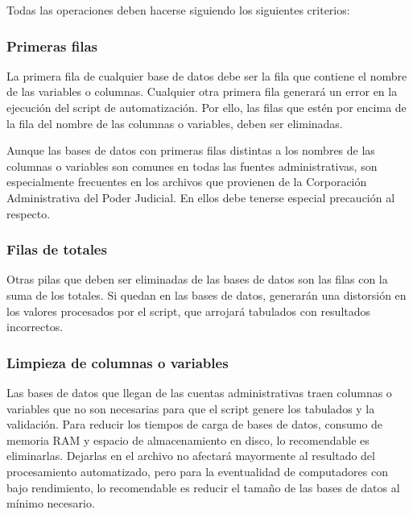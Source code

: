 \documentclass[
  spanish,
]{book}
\begin{document}
Todas las operaciones deben hacerse siguiendo los siguientes criterios:

\hypertarget{primeras-filas}{%
\subsubsection{Primeras filas}\label{primeras-filas}}

La primera fila de cualquier base de datos debe ser la fila que contiene el nombre de las variables o columnas. Cualquier otra primera fila generará un error en la ejecución del script de automatización. Por ello, las filas que estén por encima de la fila del nombre de las columnas o variables, deben ser eliminadas.

Aunque las bases de datos con primeras filas distintas a los nombres de las columnas o variables son comunes en todas las fuentes administrativas, son especialmente frecuentes en los archivos que provienen de la Corporación Administrativa del Poder Judicial. En ellos debe tenerse especial precaución al respecto.

\hypertarget{filas-de-totales}{%
\subsubsection{Filas de totales}\label{filas-de-totales}}

Otras pilas que deben ser eliminadas de las bases de datos son las filas con la suma de los totales. Si quedan en las bases de datos, generarán una distorsión en los valores procesados por el script, que arrojará tabulados con resultados incorrectos.

\hypertarget{limpieza-de-columnas-o-variables}{%
\subsubsection{Limpieza de columnas o variables}\label{limpieza-de-columnas-o-variables}}

Las bases de datos que llegan de las cuentas administrativas traen columnas o variables que no son necesarias para que el script genere los tabulados y la validación. Para reducir los tiempos de carga de bases de datos, consumo de memoria RAM y espacio de almacenamiento en disco, lo recomendable es eliminarlas. Dejarlas en el archivo no afectará mayormente al resultado del procesamiento automatizado, pero para la eventualidad de computadores con bajo rendimiento, lo recomendable es reducir el tamaño de las bases de datos al mínimo necesario.
\end{document}
